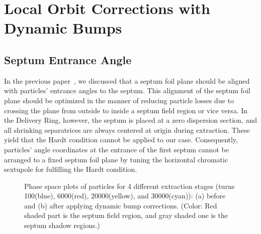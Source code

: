 \documentclass[aps,prstab,onecolumn,preprint]{revtex4-1}
\begin{document}
\section{\label{sec:bump}Local Orbit Corrections with Dynamic Bumps}

\subsection{\label{sec:bump0}Septum Entrance Angle}

In the previous paper~\cite{mu2e}, we discussed that a septum foil plane should be aligned with particles' entrance angles to the septum. This alignment of the septum foil plane should be optimized in the manner of reducing particle losses due to crossing the plane from outside to inside a septum field region or vice versa. In the Delivery Ring, however, the septum is placed at a zero dispersion section, and all shrinking separatrices are always centered at origin during extraction. These yield that the Hardt condition cannot be applied to our case. Consequently, particles' angle coordinates at the entrance of the first septum cannot be arranged to a fixed septum foil plane by tuning the horizontal chromatic sextupole for fulfilling the Hardt condition.

\begin{figure}[!hbtp]
  \caption{\label{fig:bump1}Phase space plots of particles for 4 different extraction stages (turns 100(blue), 6000(red), 20000(yellow), and 30000(cyan)): (a) before and (b) after applying dynamic bump corrections. (Color: Red shaded part is the septum field region, and gray shaded one is the septum shadow regions.)}
\end{figure}
\end{document}
